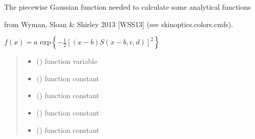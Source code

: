 \documentclass[letterpaper,10pt,english]{sphinxmanual}
\begin{document}

\begin{fulllineitems}
\label{\detokenize{01_utils:skinoptics.utils.piecewise_gaussian_Wyman}}
\pysigstartsignatures
{}
\pysigstopsignatures
\begin{DUlineblock}{0em}
\item[] The piecewise Gaussian function needed to calculate some analytical functions 
\item[] from Wyman, Sloan \& Shirley 2013 {[}WSS13{]} (see skinoptics.colors.cmfs).
\end{DUlineblock}

\sphinxAtStartPar
\(f(x) = a \mbox{ exp}\left\{-\frac{1}{2}[(x - b) S(x - b, c, d)]^2\right\}\)
\begin{quote}\begin{description}
\begin{itemize}
\item {} 
\sphinxAtStartPar
{} () \textendash{} function variable

\item {} 
\sphinxAtStartPar
{} () \textendash{} function constant

\item {} 
\sphinxAtStartPar
{} () \textendash{} function constant

\item {} 
\sphinxAtStartPar
{} () \textendash{} function constant

\item {} 
\sphinxAtStartPar
{} () \textendash{} function constant


\end{itemize}
\end{description}
\end{quote}
\end{fulllineitems}
\end{document}
